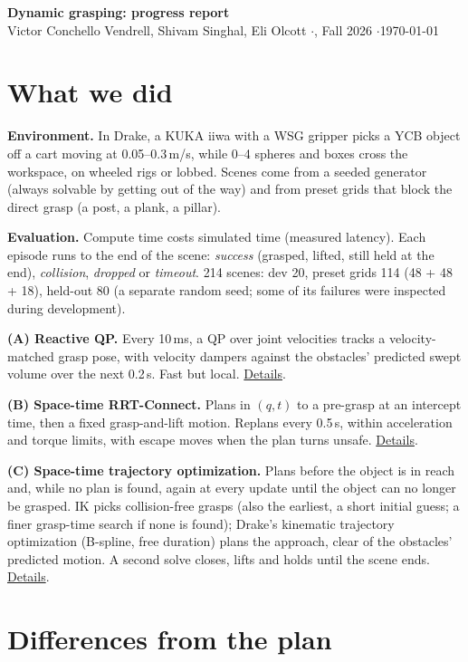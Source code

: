 \documentclass[11pt]{article}
\newcommand{\branch}{main}
\newcommand{\repo}{https://github.com/Shivsi7/dynamic-grasping/blob/\branch}
\begin{document}
\begin{center}
  {\Large\bfseries Dynamic grasping: progress report}\\[0.6ex]
  Victor Conchello Vendrell, Shivam Singhal, Eli Olcott \quad$\cdot$, Fall 2026 \quad$\cdot$\quad \today
\end{center}

\section{What we did}

\textbf{Environment.} In Drake, a KUKA iiwa with a WSG gripper picks a YCB object off a cart moving at
0.05--0.3\,m/s, while 0--4 spheres and boxes cross the workspace, on wheeled rigs or lobbed. Scenes come
from a seeded generator (always solvable by getting out of the way) and from preset grids that block the
direct grasp (a post, a plank, a pillar).

\textbf{Evaluation.} Compute time costs simulated time (measured latency). Each episode runs to the end
of the scene: \emph{success} (grasped, lifted, still held at the end), \emph{collision}, \emph{dropped}
or \emph{timeout}. 214 scenes: dev 20, preset grids 114 (48 + 48 + 18), held-out 80 (a separate random
seed; some of its failures were inspected during development).

\textbf{(A) Reactive QP.} Every 10\,ms, a QP over joint velocities tracks a velocity-matched grasp pose,
with velocity dampers against the obstacles' predicted swept volume over the next 0.2\,s. Fast but local.
\href{\repo/docs/planner_A.md}{Details}.

\textbf{(B) Space-time RRT-Connect.} Plans in $(q,t)$ to a pre-grasp at an intercept time, then a
fixed grasp-and-lift motion. Replans every 0.5\,s, within acceleration and torque limits, with escape
moves when the plan turns unsafe. \href{\repo/docs/planner_B.md}{Details}.

\textbf{(C) Space-time trajectory optimization.} Plans before the object is in reach and, while no plan
is found, again at every update until the object can no longer be grasped. IK picks collision-free grasps
(also the earliest, a short initial guess; a finer grasp-time search if none is found); Drake's kinematic
trajectory optimization (B-spline, free duration) plans the approach, clear of the obstacles' predicted motion. A second solve closes, lifts and holds until the scene
ends. \href{\repo/docs/planner_C.md}{Details}.

\section{Differences from the plan}
\end{document}
